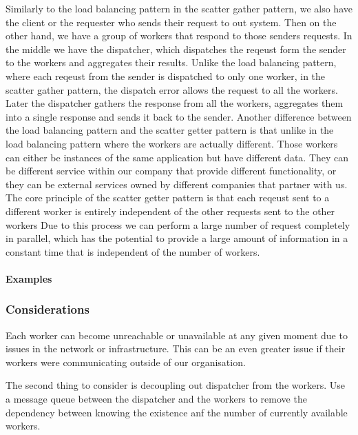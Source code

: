 \documentclass[a4paper, 11pt]{book}
\begin{document}
    Similarly to the load balancing pattern in the scatter gather pattern, we also have the client or the requester who sends their request to out system.
    Then on the other hand, we have a group of workers that respond to those senders requests.
    In the middle we have the dispatcher, which dispatches the reqeust form the sender to the workers and aggregates their results.
    Unlike the load balancing pattern, where each reqeust from the sender is dispatched to only one worker, in the scatter gather pattern, the dispatch error allows the request to all the workers.
    Later the dispatcher gathers the response from all the workers, aggregates them into a single response and sends it back to the sender.
    Another difference between the load balancing pattern and the scatter getter pattern is that unlike in the load balancing pattern where the workers are actually different.
    Those workers can either be instances of the same application but have different data.
    They can be different service within our company that provide different functionality, or they can be external services owned by different companies that partner with us.
    The core principle of the scatter getter pattern is that each reqeust sent to a different worker is entirely independent of the other requests sent to the other workers
    Due to this process we can perform a large number of request completely in parallel, which has the potential to provide a large amount of information in a constant time that is independent of the number of workers.

    \paragraph{Examples}

    \subsubsection{Considerations}

    Each worker can become unreachable or unavailable at any given moment due to issues in the network or infrastructure.
    This can be an even greater issue if their workers were communicating outside of our organisation.

    The second thing to consider is decoupling out dispatcher from the workers.
    Use a message queue between the dispatcher and the workers to remove the dependency between knowing the existence anf the number of currently available workers.
\end{document}
